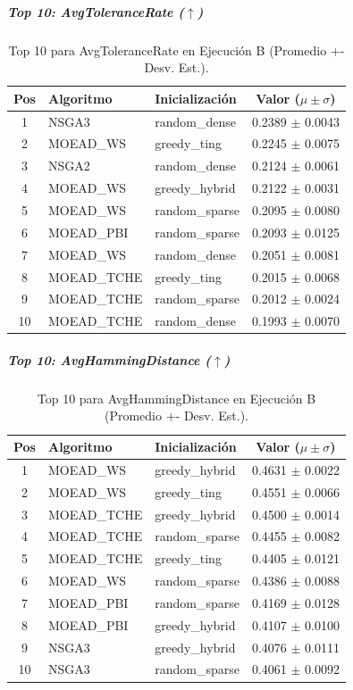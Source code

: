 \documentclass[a4paper,10pt]{article}
\begin{document}
\subparagraph{Top 10: AvgToleranceRate ($\uparrow$)}
\begin{table}[H]
    \centering
    \begin{tabular}{cllc}
        \toprule
        Pos & Algoritmo & Inicialización & Valor ($\mu \pm \sigma$) \\
        \midrule
        1 & NSGA3 & random\_dense & 0.2389 $\pm$ 0.0043 \\
        2 & MOEAD\_WS & greedy\_ting & 0.2245 $\pm$ 0.0075 \\
        3 & NSGA2 & random\_dense & 0.2124 $\pm$ 0.0061 \\
        4 & MOEAD\_WS & greedy\_hybrid & 0.2122 $\pm$ 0.0031 \\
        5 & MOEAD\_WS & random\_sparse & 0.2095 $\pm$ 0.0080 \\
        6 & MOEAD\_PBI & random\_sparse & 0.2093 $\pm$ 0.0125 \\
        7 & MOEAD\_WS & random\_dense & 0.2051 $\pm$ 0.0081 \\
        8 & MOEAD\_TCHE & greedy\_ting & 0.2015 $\pm$ 0.0068 \\
        9 & MOEAD\_TCHE & random\_sparse & 0.2012 $\pm$ 0.0024 \\
        10 & MOEAD\_TCHE & random\_dense & 0.1993 $\pm$ 0.0070 \\
        \bottomrule
    \end{tabular}
    \caption{Top 10 para AvgToleranceRate en Ejecución B (Promedio +- Desv. Est.).}
\end{table}

\subparagraph{Top 10: AvgHammingDistance ($\uparrow$)}
\begin{table}[H]
    \centering
    \begin{tabular}{cllc}
        \toprule
        Pos & Algoritmo & Inicialización & Valor ($\mu \pm \sigma$) \\
        \midrule
        1 & MOEAD\_WS & greedy\_hybrid & 0.4631 $\pm$ 0.0022 \\
        2 & MOEAD\_WS & greedy\_ting & 0.4551 $\pm$ 0.0066 \\
        3 & MOEAD\_TCHE & greedy\_hybrid & 0.4500 $\pm$ 0.0014 \\
        4 & MOEAD\_TCHE & random\_sparse & 0.4455 $\pm$ 0.0082 \\
        5 & MOEAD\_TCHE & greedy\_ting & 0.4405 $\pm$ 0.0121 \\
        6 & MOEAD\_WS & random\_sparse & 0.4386 $\pm$ 0.0088 \\
        7 & MOEAD\_PBI & random\_sparse & 0.4169 $\pm$ 0.0128 \\
        8 & MOEAD\_PBI & greedy\_hybrid & 0.4107 $\pm$ 0.0100 \\
        9 & NSGA3 & greedy\_hybrid & 0.4076 $\pm$ 0.0111 \\
        10 & NSGA3 & random\_sparse & 0.4061 $\pm$ 0.0092 \\
        \bottomrule
    \end{tabular}
    \caption{Top 10 para AvgHammingDistance en Ejecución B (Promedio +- Desv. Est.).}
\end{table}
\end{document}
